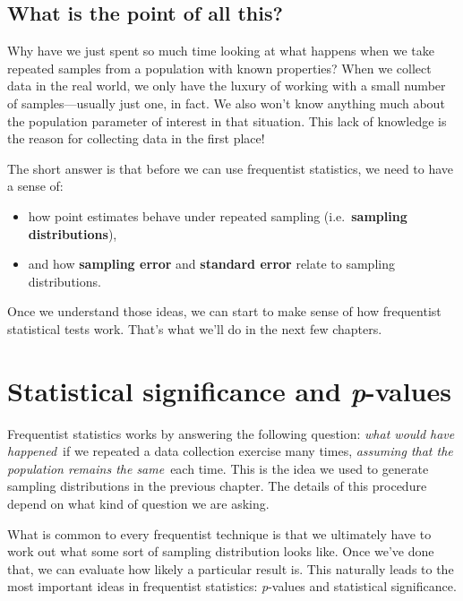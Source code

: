 \documentclass[
]{book}
\providecommand{\tightlist}{%
  \setlength{\itemsep}{0pt}\setlength{\parskip}{0pt}}
\begin{document}
\hypertarget{what-is-the-point-of-all-this}{%
\section{What is the point of all this?}\label{what-is-the-point-of-all-this}}

Why have we just spent so much time looking at what happens when we take repeated samples from a population with known properties? When we collect data in the real world, we only have the luxury of working with a small number of samples---usually just one, in fact. We also won't know anything much about the population parameter of interest in that situation. This lack of knowledge is the reason for collecting data in the first place!

The short answer is that before we can use frequentist statistics, we need to have a sense of:

\begin{itemize}
\tightlist
\item
  how point estimates behave under repeated sampling (i.e.~\textbf{sampling distributions}),
\item
  and how \textbf{sampling error} and \textbf{standard error} relate to sampling distributions.
\end{itemize}

Once we understand those ideas, we can start to make sense of how frequentist statistical tests work. That's what we'll do in the next few chapters.

\hypertarget{statistical-significance-and-p-values}{%
\chapter{\texorpdfstring{Statistical significance and \emph{p}-values}{Statistical significance and p-values}}\label{statistical-significance-and-p-values}}

Frequentist statistics works by answering the following question: \emph{what would have happened}~if we repeated a data collection exercise many times, \emph{assuming that the population remains the same}~each time. This is the idea we used to generate sampling distributions in the previous chapter. The details of this procedure depend on what kind of question we are asking.

What is common to every frequentist technique is that we ultimately have to work out what some sort of sampling distribution looks like. Once we've done that, we can evaluate how likely a particular result is. This naturally leads to the most important ideas in frequentist statistics: \emph{p}-values and statistical significance.
\end{document}
